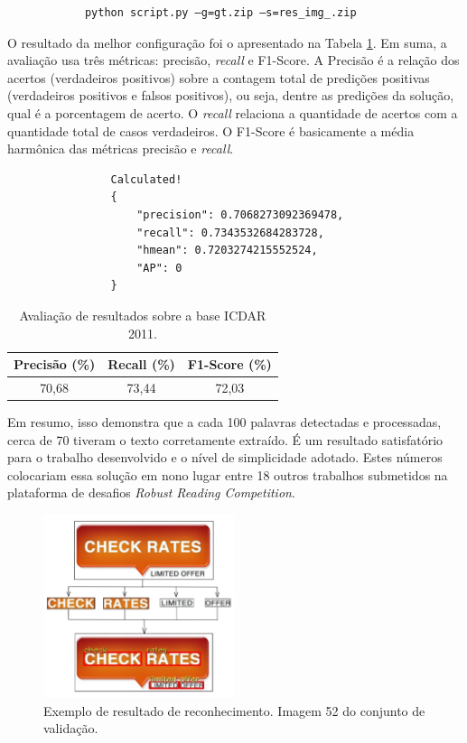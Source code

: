 \begin{verbatim}
            python script.py –g=gt.zip –s=res_img_.zip
\end{verbatim}

O resultado da melhor configuração foi o apresentado na Tabela \ref{tab:icdar11_results}. Em suma, a avaliação usa três 
métricas: precisão, \textit{recall} e F1-Score. A Precisão é a relação dos acertos (verdadeiros positivos) sobre a contagem 
total de predições positivas (verdadeiros positivos e falsos positivos), ou seja, dentre as predições da solução, qual 
é a porcentagem de acerto. O \textit{recall} relaciona a quantidade de acertos com a quantidade total de casos verdadeiros. 
O F1-Score é basicamente a média harmônica das métricas precisão e \textit{recall}.

\begin{verbatim}
                Calculated!
                {
                    "precision": 0.7068273092369478,
                    "recall": 0.7343532684283728,
                    "hmean": 0.7203274215552524, 
                    "AP": 0
                }
\end{verbatim}

\begin{table}[htb]
    \centering
    \caption{Avaliação de resultados sobre a base ICDAR 2011.}
    \begin{tabular}{|c|c|c|}
        \hline
        Precisão (\%) & Recall (\%) & F1-Score (\%) \\
        \hline
        70,68 & 73,44 & 72,03\\
        \hline
    \end{tabular}
    \label{tab:icdar11_results}
\end{table}

Em resumo, isso demonstra que a cada 100 palavras detectadas e processadas, cerca de 70 tiveram o texto corretamente 
extraído. É um resultado satisfatório para o trabalho desenvolvido e o nível de simplicidade adotado. Estes números colocariam 
essa solução em nono lugar entre 18 outros trabalhos submetidos na plataforma de desafios \textit{Robust Reading Competition}.

\begin{figure}
    \centering
    \includegraphics[width=0.5\textwidth]{figs/resultados-icdar11-01.png}
    \caption{Exemplo de resultado de reconhecimento. Imagem 52 do conjunto de validação.}
    \label{fig:results_icdar11_01}
\end{figure}

